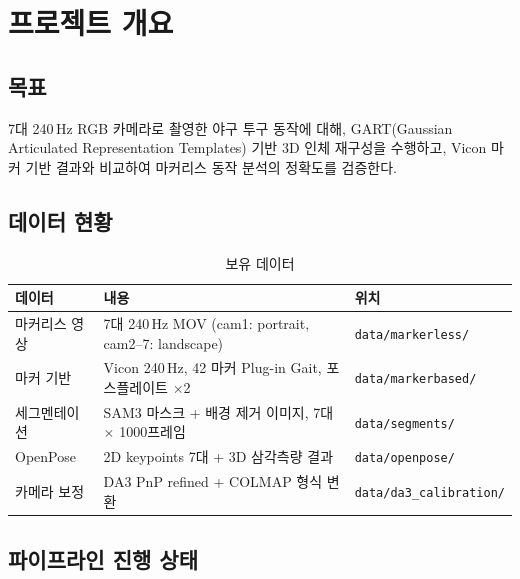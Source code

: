 \documentclass[11pt, a4paper]{report}
\begin{document}
\tableofcontents
\newpage


\chapter{프로젝트 개요}

\section{목표}

7대 240\,Hz RGB 카메라로 촬영한 야구 투구 동작에 대해,
GART(Gaussian Articulated Representation Templates) 기반 3D 인체 재구성을 수행하고,
Vicon 마커 기반 결과와 비교하여 마커리스 동작 분석의 정확도를 검증한다.

\section{데이터 현황}

\begin{table}[H]
\centering
\caption{보유 데이터}
\renewcommand{\arraystretch}{1.3}
\begin{tabularx}{\textwidth}{lXl}
\toprule
\textbf{데이터} & \textbf{내용} & \textbf{위치} \\
\midrule
마커리스 영상 & 7대 240\,Hz MOV (cam1: portrait, cam2--7: landscape) & \texttt{data/markerless/} \\
마커 기반 & Vicon 240\,Hz, 42 마커 Plug-in Gait, 포스플레이트 $\times$2 & \texttt{data/markerbased/} \\
세그멘테이션 & SAM3 마스크 + 배경 제거 이미지, 7대 $\times$ 1000프레임 & \texttt{data/segments/} \\
OpenPose & 2D keypoints 7대 + 3D 삼각측량 결과 & \texttt{data/openpose/} \\
카메라 보정 & DA3 PnP refined + COLMAP 형식 변환 & \texttt{data/da3\_calibration/} \\
\bottomrule
\end{tabularx}
\end{table}


\section{파이프라인 진행 상태}
\end{document}
